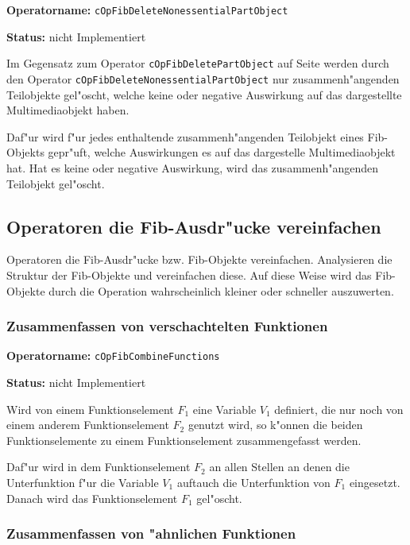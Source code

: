 \textbf{Operatorname:} \verb|cOpFibDeleteNonessentialPartObject|

\bigskip\noindent
\textbf{Status:} nicht Implementiert

\bigskip\noindent
Im Gegensatz zum Operator \verb|cOpFibDeletePartObject| auf Seite \pageref{secOpFibDeletePartObject} werden durch den Operator \verb|cOpFibDeleteNonessentialPartObject| nur zusammenh"angenden Teilobjekte gel"oscht, welche keine oder negative Auswirkung auf das dargestellte Multimediaobjekt haben.

Daf"ur wird f"ur jedes enthaltende zusammenh"angenden Teilobjekt eines Fib-Objekts gepr"uft, welche Auswirkungen es auf das dargestelle Multimediaobjekt hat. Hat es keine oder negative Auswirkung, wird das zusammenh"angenden Teilobjekt gel"oscht.



\subsection{Operatoren die Fib-Ausdr"ucke vereinfachen}

Operatoren die Fib-Ausdr"ucke bzw. Fib-Objekte vereinfachen. Analysieren die Struktur der Fib-Objekte und vereinfachen diese. Auf diese Weise wird das Fib-Objekte durch die Operation wahrscheinlich kleiner oder schneller auszuwerten.


\subsubsection{Zusammenfassen von verschachtelten Funktionen}

\textbf{Operatorname:} \verb|cOpFibCombineFunctions|

\bigskip\noindent
\textbf{Status:} nicht Implementiert

\bigskip\noindent
Wird von einem Funktionselement $F_1$ eine Variable $V_1$ definiert, die nur noch von einem anderem Funktionselement $F_2$ genutzt wird, so k"onnen die beiden Funktionselemente zu einem Funktionselement zusammengefasst werden.

Daf"ur wird in dem Funktionselement $F_2$ an allen Stellen an denen die Unterfunktion f"ur die Variable $V_1$ auftauch die Unterfunktion von $F_1$ eingesetzt. Danach wird das Funktionselement $F_1$ gel"oscht.


\subsubsection{Zusammenfassen von "ahnlichen Funktionen}

